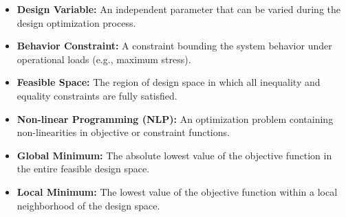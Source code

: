 \documentclass[12pt,a4paper]{article}
\begin{document}
\begin{tcolorbox}[defbox, title={\textbf{One-Line Definitions}}]
\begin{itemize}[leftmargin=*, itemsep=2.5pt, topsep=0pt]
  \item \textbf{Design Variable:} An independent parameter that can be varied during the design optimization process.
  \item \textbf{Behavior Constraint:} A constraint bounding the system behavior under operational loads (e.g., maximum stress).
  \item \textbf{Feasible Space:} The region of design space in which all inequality and equality constraints are fully satisfied.
  \item \textbf{Non-linear Programming (NLP):} An optimization problem containing non-linearities in objective or constraint functions.
  \item \textbf{Global Minimum:} The absolute lowest value of the objective function in the entire feasible design space.
  \item \textbf{Local Minimum:} The lowest value of the objective function within a local neighborhood of the design space.
\end{itemize}
\end{tcolorbox}
\end{document}
